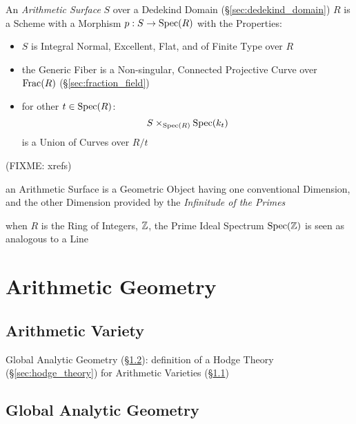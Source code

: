 \begin{itemize}
\begin{itemize}
An \emph{Arithmetic Surface} $S$ over a Dedekind Domain
(\S\ref{sec:dedekind_domain}) $R$ is a Scheme with a Morphism $p : S \rightarrow
\mathrm{Spec}(R)$ with the Properties:
\begin{itemize}
  \item $S$ is Integral Normal, Excellent, Flat, and of Finite Type over $R$
  \item the Generic Fiber is a Non-singular, Connected Projective Curve over
    $\mathrm{Frac}(R)$ (\S\ref{sec:fraction_field})
  \item for other $t \in \mathrm{Spec}(R)$:
    \[
      S \times_{\mathrm{Spec}(R)} \mathrm{Spec}(k_t)
    \]
    is a Union of Curves over $R / t$
\end{itemize}
(FIXME: xrefs)

an Arithmetic Surface is a Geometric Object having one conventional Dimension,
and the other Dimension provided by the \emph{Infinitude of the Primes}

when $R$ is the Ring of Integers, $\mathbb{Z}$, the Prime Ideal Spectrum
$\mathrm{Spec}(\mathbb{Z})$ is seen as analogous to a Line



\section{Arithmetic Geometry}\label{sec:arithmetic_geometry}

\subsection{Arithmetic Variety}\label{sec:arithmetic_variety}

Global Analytic Geometry (\S\ref{sec:global_analytic_geometry}): definition of
a Hodge Theory (\S\ref{sec:hodge_theory}) for Arithmetic Varieties
(\S\ref{sec:arithmetic_variety})



\subsection{Global Analytic Geometry}\label{sec:global_analytic_geometry}


\end{itemize}
\end{itemize}
